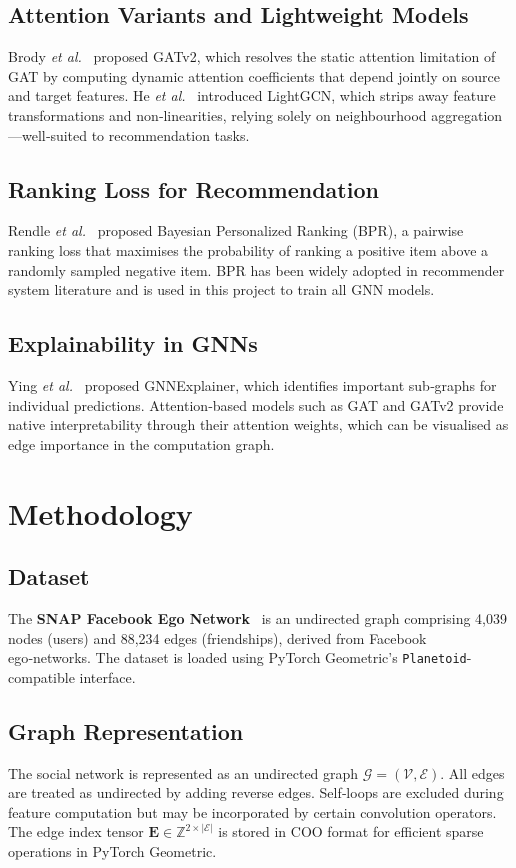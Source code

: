 \documentclass[conference]{IEEEtran}
\begin{document}
\subsection{Attention Variants and Lightweight Models}
Brody \textit{et al.}~\cite{brody2022} proposed GATv2, which resolves the static attention limitation of GAT by computing dynamic attention coefficients that depend jointly on source and target features. He \textit{et al.}~\cite{he2020} introduced LightGCN, which strips away feature transformations and non‑linearities, relying solely on neighbourhood aggregation—well‑suited to recommendation tasks.

\subsection{Ranking Loss for Recommendation}
Rendle \textit{et al.}~\cite{rendle2009} proposed Bayesian Personalized Ranking (BPR), a pairwise ranking loss that maximises the probability of ranking a positive item above a randomly sampled negative item. BPR has been widely adopted in recommender system literature and is used in this project to train all GNN models.

\subsection{Explainability in GNNs}
Ying \textit{et al.}~\cite{ying2019} proposed GNNExplainer, which identifies important sub‑graphs for individual predictions. Attention‑based models such as GAT and GATv2 provide native interpretability through their attention weights, which can be visualised as edge importance in the computation graph.

\section{Methodology}\label{sec:methodology}
\subsection{Dataset}
The \textbf{SNAP Facebook Ego Network}~\cite{leskovec2012} is an undirected graph comprising 4,039 nodes (users) and 88,234 edges (friendships), derived from Facebook ego‑networks. The dataset is loaded using PyTorch Geometric's \texttt{Planetoid}-compatible interface.

\subsection{Graph Representation}
The social network is represented as an undirected graph $\mathcal{G}=(\mathcal{V},\mathcal{E})$. All edges are treated as undirected by adding reverse edges. Self‑loops are excluded during feature computation but may be incorporated by certain convolution operators. The edge index tensor $\mathbf{E}\in\mathbb{Z}^{2\times|\mathcal{E}|}$ is stored in COO format for efficient sparse operations in PyTorch Geometric.
\end{document}
